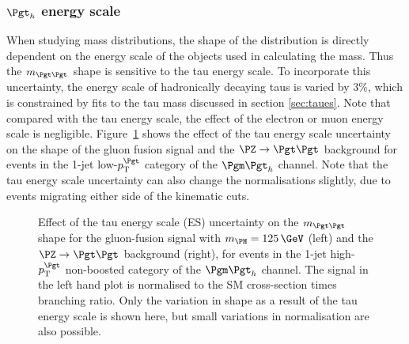 \subsubsection{$\Pgth$ energy scale} 
When studying mass distributions, the shape of the distribution is directly
dependent on the energy scale of the objects used in calculating the mass. Thus the
$m_{\Pgt\Pgt}$ shape is sensitive to the tau energy scale.
To incorporate this uncertainty, the energy scale of hadronically decaying taus is varied by $3\%$,
which is constrained by fits to the tau mass discussed in section
\ref{sec:taues}. Note that compared with the tau energy scale, the effect of the
electron or muon energy scale is negligible. Figure~\ref{fig:tauessvfit} shows the
effect of the tau energy scale uncertainty on the shape of the gluon fusion signal and the
$\PZ\to\Pgt\Pgt$ background for events in the 1-jet low-$\pt^{\Pgt}$ category of
the $\mutau$ channel. Note that the tau energy scale uncertainty can also change
the normalisations slightly, due to events migrating either side of the
kinematic cuts.

\begin{figure}
\begin{center}

\end{center}
\caption[Effect of the tau energy scale uncertainty on the $m_{\Pgt\Pgt}$ shape for
the gluon-fusion signal with $m_{\PH}=125\,\GeV$ (left) and the $\ZToTauTau$ background (right).]{
Effect of the tau energy scale (ES) uncertainty on the $m_{\Pgt\Pgt}$ shape for
the gluon-fusion signal with $m_{\PH}=125\,\GeV$ (left) and the $\ZToTauTau$
background (right), for events in the 1-jet high-$\pt^{\Pgt}$ non-boosted category of
the $\mutau$ channel. The signal in the left hand plot is normalised to the
\ac{SM} cross-section times branching ratio. Only the variation in shape as a
result of the tau energy scale is shown here, but small variations in
normalisation are also possible.}
\label{fig:tauessvfit}
\end{figure} 

